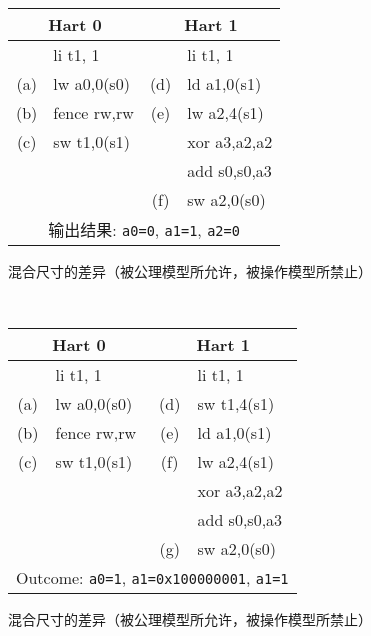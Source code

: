 \begin{figure}[h!]
  \centering\small
  {\tt
    \begin{tabular}{cl||cl}
    \multicolumn{2}{c}{Hart 0} & \multicolumn{2}{c}{Hart 1} \\
    \hline
          & li t1, 1    &     & li t1, 1      \\
      (a) & lw a0,0(s0) & (d) & ld a1,0(s1)   \\
      (b) & fence rw,rw & (e) & lw a2,4(s1)   \\
      (c) & sw t1,0(s1) &     & xor a3,a2,a2  \\
          &             &     & add s0,s0,a3  \\
          &             & (f) & sw a2,0(s0)   \\
      \hline
      \multicolumn{4}{c}{输出结果: {\tt a0=0}, {\tt a1=1}, {\tt a2=0}}
    \end{tabular}
  }
  \caption{混合尺寸的差异（被公理模型所允许，被操作模型所禁止）
    }
  \label{fig:litmus:discrepancy:rsw2}
\end{figure}

\begin{figure}[h!]
  \centering\small
  {\tt
    \begin{tabular}{cl||cl}
    \multicolumn{2}{c}{Hart 0} & \multicolumn{2}{c}{Hart 1} \\
    \hline
          & li t1, 1    &     & li t1, 1      \\
      (a) & lw a0,0(s0) & (d) & sw t1,4(s1)   \\
      (b) & fence rw,rw & (e) & ld a1,0(s1)   \\
      (c) & sw t1,0(s1) & (f) & lw a2,4(s1)   \\
          &             &     & xor a3,a2,a2  \\
          &             &     & add s0,s0,a3  \\
          &             & (g) & sw a2,0(s0)   \\
      \hline
      \multicolumn{4}{c}{Outcome: {\tt a0=1}, {\tt a1=0x100000001}, {\tt a1=1}}
    \end{tabular}
  }
  \caption{混合尺寸的差异（被公理模型所允许，被操作模型所禁止）}
  \label{fig:litmus:discrepancy:rsw3}
\end{figure}

